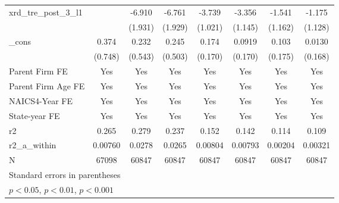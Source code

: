 {\begin{tabular}{l*{7}{c}}
xrd\_tre\_post\_3\_l1&                     &      -6.910\sym{***}&      -6.761\sym{**} &      -3.739\sym{***}&      -3.356\sym{**} &      -1.541         &      -1.175         \\
            &                     &     (1.931)         &     (1.929)         &     (1.021)         &     (1.145)         &     (1.162)         &     (1.128)         \\
[1em]
\_cons      &       0.374         &       0.232         &       0.245         &       0.174         &      0.0919         &       0.103         &      0.0130         \\
            &     (0.748)         &     (0.543)         &     (0.503)         &     (0.170)         &     (0.170)         &     (0.175)         &     (0.168)         \\
[1em]
Parent Firm FE&         Yes         &         Yes         &         Yes         &         Yes         &         Yes         &         Yes         &         Yes         \\
[1em]
Parent Firm Age FE&         Yes         &         Yes         &         Yes         &         Yes         &         Yes         &         Yes         &         Yes         \\
[1em]
NAICS4-Year FE&         Yes         &         Yes         &         Yes         &         Yes         &         Yes         &         Yes         &         Yes         \\
[1em]
State-year FE&         Yes         &         Yes         &         Yes         &         Yes         &         Yes         &         Yes         &         Yes         \\
\hline
r2          &       0.265         &       0.279         &       0.237         &       0.152         &       0.142         &       0.114         &       0.109         \\
r2\_a\_within &     0.00760         &      0.0278         &      0.0265         &     0.00804         &     0.00793         &     0.00204         &     0.00321         \\
N           &       67098         &       60847         &       60847         &       60847         &       60847         &       60847         &       60847         \\
\hline\hline
\multicolumn{8}{l}{\footnotesize Standard errors in parentheses}\\
\multicolumn{8}{l}{\footnotesize \sym{*} \(p<0.05\), \sym{**} \(p<0.01\), \sym{***} \(p<0.001\)}\\
\end{tabular}
}
